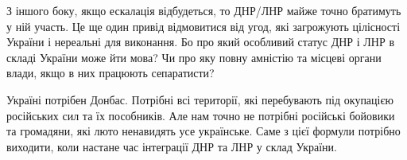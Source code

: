 З іншого боку, якщо ескалація відбудеться, то ДНР/ЛНР майже точно братимуть у
ній участь. Це ще один привід відмовитися від угод, які загрожують цілісності
України і нереальні для виконання. Бо про який особливий статус ДНР і ЛНР в
складі України може йти мова? Чи про яку повну амністію та місцеві органи
влади, якщо в них працюють сепаратисти?

Україні потрібен Донбас. Потрібні всі території, які перебувають під окупацією
російських сил та їх пособників. Але нам точно не потрібні російські бойовики
та громадяни, які люто ненавидять усе українське. Саме з цієї формули потрібно
виходити, коли настане час інтеграції ДНР та ЛНР у склад України.
